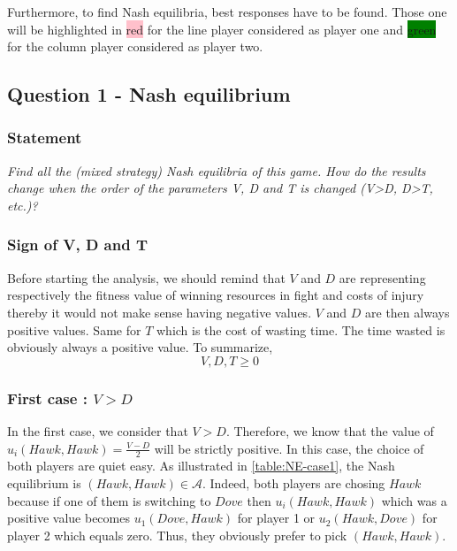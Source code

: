 \documentclass{article}
\begin{document}
Furthermore, to find Nash equilibria, best responses have to be found. Those one will be highlighted in \colorbox{pink}{red} for the line player considered as player one and \colorbox{green}{green} for the column player considered as player two. 

\subsection{Question 1 - Nash equilibrium}

\subsubsection*{Statement} 
\noindent
\textit{ Find all the (mixed strategy) Nash equilibria of this game. How do the results change when the order of the parameters V, D and T is changed (V>D, D>T, etc.)?}

\subsubsection*{Sign of V, D and T} 
Before starting the analysis, we should remind that $V$ and $D$ are representing respectively the fitness value of winning resources in fight and costs of injury thereby it would not make sense having negative values. $V$ and $D$ are then always positive values. Same for $T$ which is the cost of wasting time. The time wasted is obviously always a positive value. To summarize, 
$$ V, D, T \ge 0 $$  


\subsubsection{First case : $V>D$} 

In the first case, we consider that $V>D$. Therefore, we know that the value of $u_{i}(Hawk, Hawk) = \frac{V-D}{2}$ will be strictly positive. In this case, the choice of both players are quiet easy. As illustrated in \autoref{table:NE-case1}, the Nash equilibrium is $(Hawk, Hawk) \in \mathcal{A}$. Indeed, both players are chosing $Hawk$ because if one of them is switching to $Dove$ then $u_{i}(Hawk,Hawk)$ which was a positive value becomes $u_{1}(Dove,Hawk)$ for player 1 or $u_{2}(Hawk,Dove)$ for player 2 which equals zero. Thus, they obviously prefer to pick $(Hawk,Hawk)$. \\

\begin{center}
\end{center} 
\end{document}

